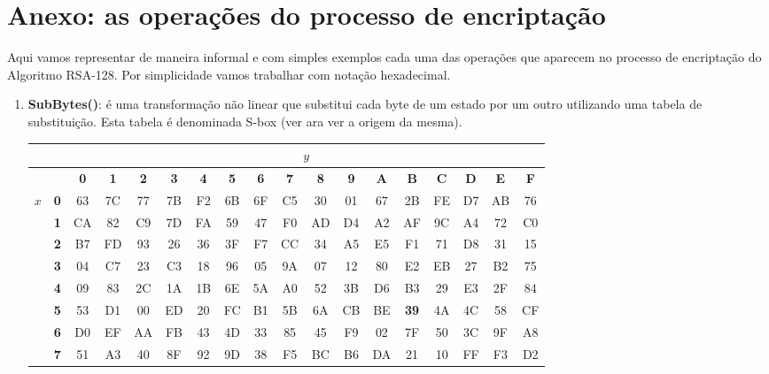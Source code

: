 \section*{Anexo: as operações do processo de encriptação}\label{Anexo}
Aqui vamos representar de maneira informal e com simples exemplos cada uma das operações que aparecem no processo de encriptação do Algoritmo RSA-128. Por simplicidade vamos trabalhar com notação hexadecimal.
\begin{enumerate}
\item {\bf SubBytes(\cdot)}: é uma transformação não linear que substitui cada byte de um estado por um outro utilizando uma tabela de substituição. Esta tabela é denominada S-box (ver \cite{Federal} ara ver a origem da mesma).
\begin{table}[ht!]
\begin{center}
\tiny{
\begin{tabular}{|c|c|c|c|c|c|c|c|c|c|c|c|c|c|c|c|c|c|}\hline
& & \multicolumn{16}{c|}{$y$}\\\hline
& &{\textbf 0} & {\textbf 1} & {\textbf 2} & {\textbf 3} & {\textbf 4} & {\textbf 5} & {\textbf 6} & {\textbf 7} & {\textbf 8} & {\textbf 9} & {\textbf A} & {\textbf B} & {\textbf C} & {\textbf D} & {\textbf E} & {\textbf F}\\
\multirow{16}{*}{$x$} & {\textbf 0} & 63 & 7C & 77 & 7B & F2 & 6B & 6F & C5 & 30 & 01 & 67 & 2B & FE & D7 & AB & 76 \\
                    & {\textbf 1} & CA & 82 & C9 & 7D & FA & 59 & 47 & F0 & AD & D4 & A2 & AF & 9C & A4 & 72 & C0 \\
                    & {\textbf 2} & B7 & FD & 93 & 26 & 36 & 3F & F7 & CC & 34 & A5 & E5 & F1 & 71 & D8 & 31 & 15 \\
                    & {\textbf 3} & 04 & C7 & 23 & C3 & 18 & 96 & 05 & 9A & 07 & 12 & 80 & E2 & EB & 27 & B2 & 75 \\
                    & {\textbf 4} & 09 & 83 & 2C & 1A & 1B & 6E & 5A & A0 & 52 & 3B & D6 & B3 & 29 & E3 & 2F & 84 \\
                    & {\textbf 5} & 53 & D1 & 00 & ED & 20 & FC & B1 & 5B & 6A & CB & BE & \textbf{39} & 4A & 4C & 58 & CF \\
                    & {\textbf 6} & D0 & EF & AA & FB & 43 & 4D & 33 & 85 & 45 & F9 & 02 & 7F & 50 & 3C & 9F & A8 \\
                    & {\textbf 7} & 51 & A3 & 40 & 8F & 92 & 9D & 38 & F5 & BC & B6 & DA & 21 & 10 & FF & F3 & D2 \\

\end{tabular}}
\end{center}
\end{table}
\end{enumerate}
